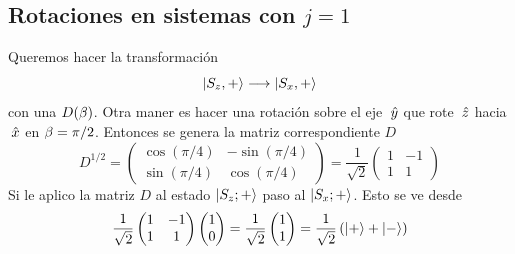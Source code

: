 \documentclass[10pt,oneside]{CBFT_book}
\begin{document}
\subsection{Rotaciones en sistemas con $j=1$}

Queremos hacer la transformación 
\[
	\Ket{S_z,+} \longrightarrow \Ket{S_x,+}
\]
con una $D(\beta)$. Otra maner es hacer una rotación sobre el eje $\:\hat{y}$ que rote $\:\hat{z}$ hacia $\:\hat{x}$
en $\beta=\pi/2$. Entonces se genera la matriz correspondiente $D$
\[
	D^{1/2} = \begin{pmatrix}
	           \cos(\pi/4) & -\sin(\pi/4) \\
	           \sin(\pi/4) & \cos(\pi/4)
	          \end{pmatrix} = \frac{1}{\sqrt{2}}
		\begin{pmatrix}
	           1 & -1 \\
	           1 & 1
	          \end{pmatrix}	          
\]
Si le aplico la matriz $D$ al estado $\Ket{S_z;+}$ paso al $\Ket{S_x;+}$. Esto se ve desde 
\[
	\frac{1}{\sqrt{2}}\begin{pmatrix}
	           1 & -1 \\
	           1 & 1
	          \end{pmatrix}	 
		\begin{pmatrix}
	           1 \\
	           0 
	          \end{pmatrix}	 =
	          \frac{1}{\sqrt{2}}
		\begin{pmatrix}
	           1 \\
	           1 
	          \end{pmatrix}	 =
	           \frac{1}{\sqrt{2}}
	           \left( \Ket{+} + \Ket{-} \right)
\]
\end{document}
